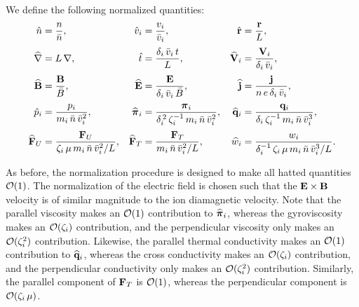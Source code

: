 \documentclass[notitlepage,12pt]{article}
\newcommand{\bpi}{\mbox{\boldmath$\pi$}}
\begin{document}
We
define the following normalized quantities: 
\begin{align}
\hat{n} &=\frac{ n}{\bar{n}},&
\hat{v}_i &= \frac{v_i}{\bar{v}_i},& 
\hat{\bf r} &= \frac{{\bf r}}{ L}, \nonumber\\[0.5ex]
\widehat{\nabla} &= L\,\nabla, &
\hat{t} &= \frac{\delta_i\,\bar{v}_i\,t}{L}, &
\widehat{\bf V}_i &= \frac{{\bf V}_i}{\delta_i\,\bar{v}_i}, \nonumber\\[0.5ex]
\widehat{\bf B}&= \frac{{\bf B}}{\bar{B}}, &
\widehat{\bf E} &= \frac{{\bf E}}{ \delta_i\,\bar{v}_i\,\bar{B}},&
\widehat{\bf j} &=\frac{{\bf j} }{ n\,e\,\delta_i\,\bar{v}_i},\nonumber\\[0.5ex]
 \hat{p}_i &=\frac{ p_i}{m_i\,\bar{n}\,\bar{v}_i^{2}}, &
 \widehat{\bpi}_i&= \frac{\bpi_i}{\delta_i^{\,2}\,\zeta_i^{-1}\,m_i\,\bar{n}\,\bar{v}_i^{2}}, &
\widehat{\bf q}_{i} &= \frac{{\bf q}_{i} }{ \delta_i\,\zeta_i^{-1}\,m_i\,\bar{n}\,\bar{v}_i^{3}},  \nonumber\\[0.5ex]
\widehat{\bf F}_U &= \frac{{\bf F}_U}{ \zeta_i\,\mu\,m_i\,\bar{n}\,\bar{v}_i^{2}/L}, &
\widehat{\bf F}_T &=\frac{ {\bf F}_T}{m_i\,\bar{n}\,\bar{v}_i^{2}/L},&
\widehat{w}_i& = \frac{w_i}{\delta_i^{-1}\,\zeta_i\,\mu\, m_i\,\bar{n}\,\bar{v}_i^{3}/L}.\nonumber
\end{align}

As before, the normalization procedure is designed to make all hatted quantities ${\cal O}(1)$.
The normalization of the electric field is chosen 
 such that the ${\bf E}\times{\bf B}$
velocity is of similar  magnitude to the ion diamagnetic velocity. Note that the parallel viscosity
makes an ${\cal O}(1)$ contribution to $\widehat{\bpi}_i$, whereas the gyroviscosity
makes an ${\cal O}(\zeta_i)$ contribution, and the perpendicular viscosity only 
makes an ${\cal O}(\zeta_i^{2})$ contribution. Likewise, the parallel thermal
conductivity 
makes an ${\cal O}(1)$ contribution to $\widehat{\bf q}_{i}$, whereas the cross
conductivity 
makes an ${\cal O}(\zeta_i)$ contribution, and the perpendicular conductivity only 
makes an ${\cal O}(\zeta_i^{2})$ contribution. Similarly, the parallel component
of ${\bf F}_T$ is  ${\cal O}(1)$, whereas the perpendicular
component is  ${\cal O}(\zeta_i\,\mu)$. 
\end{document}
